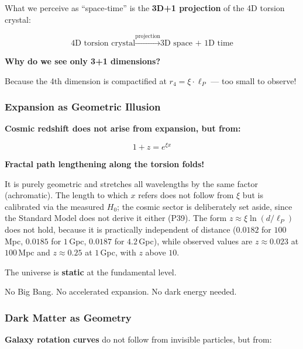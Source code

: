 	What we perceive as \enquote{space‑time} is the \textbf{3D+1 projection} of the 4D torsion crystal:

	\begin{equation}
		\text{4D torsion crystal} \xrightarrow{\text{projection}} \text{3D space + 1D time}
	\end{equation}

	\textbf{Why do we see only 3+1 dimensions?}

	Because the 4th dimension is compactified at $r_4 = \xi \cdot \ell_P$ — too small to observe!

	\subsubsection{Expansion as Geometric Illusion}

	\begin{keyresult}
		\textbf{Cosmic redshift does not arise from expansion, but from:}

		\begin{equation}
			\boxed{1 + z = e^{\xi x}}
		\end{equation}

		\textbf{Fractal path lengthening along the torsion folds!}

		It is purely geometric and stretches all wavelengths by the same factor (achromatic). The length to which $x$ refers does not follow from $\xi$ but is calibrated via the measured $H_0$; the cosmic sector is deliberately set aside, since the Standard Model does not derive it either (P39). The form $z \approx \xi \ln(d/\ell_P)$ does not hold, because it is practically independent of distance ($0.0182$ for $100$\,Mpc, $0.0185$ for $1$\,Gpc, $0.0187$ for $4.2$\,Gpc), while observed values are $z \approx 0.023$ at $100$\,Mpc and $z \approx 0.25$ at $1$\,Gpc, with $z$ above $10$.

		\vspace{0.3cm}

		The universe is \textbf{static} at the fundamental level.

		No Big Bang. No accelerated expansion. No dark energy needed.
	\end{keyresult}

	\subsubsection{Dark Matter as Geometry}

	\textbf{Galaxy rotation curves} do not follow from invisible particles, but from:

